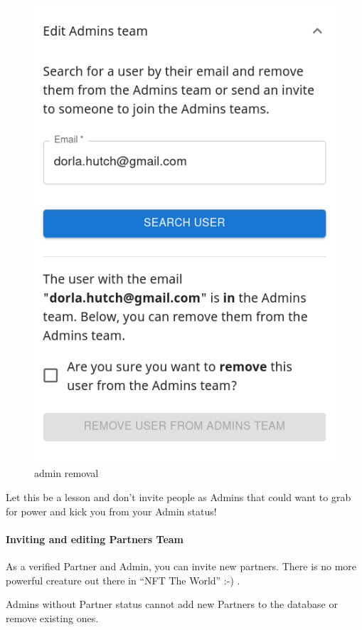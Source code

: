 \documentclass[
]{article}
\begin{document}
\begin{figure}
\centering
\includegraphics{images/remove_existing_admin.png}
\caption{admin removal}
\end{figure}\newpage

Let this be a lesson and don't invite people as Admins that could want
to grab for power and kick you from your Admin status!

\hypertarget{inviting-and-editing-partners-team}{%
\paragraph{Inviting and editing Partners
Team}\label{inviting-and-editing-partners-team}}

As a verified Partner and Admin, you can invite new partners. There is
no more powerful creature out there in ``NFT The World'' :-) .

Admins without Partner status cannot add new Partners to the database or
remove existing ones.
\end{document}
